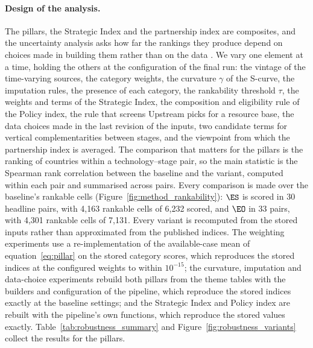 \paragraph{Design of the analysis.} The pillars, the Strategic Index and the partnership
index are composites, and the uncertainty analysis asks how far the rankings they produce
depend on choices made in building them rather than on the data
\citep{saisana2005uncertainty, oecd2008handbook, saltelli2008global}. We vary one element at a
time, holding the others at the configuration of the final run: the vintage of the time-varying
sources, the category weights, the curvature $\gamma$ of the S-curve, the imputation rules, the
presence of each category, the rankability threshold $\tau$, the weights and terms of the
Strategic Index, the composition and eligibility rule of the Policy index, the rule that
screens Upstream picks for a resource base, the data choices made in the last revision of the
inputs, two candidate terms for vertical complementarities between stages, and the viewpoint
from which the partnership index is averaged. The comparison that matters for the pillars is the
ranking of countries within a technology--stage pair, so the main statistic is the Spearman rank
correlation between the baseline and the variant, computed within each pair and summarised
across pairs. Every comparison is made over the baseline's rankable cells
(Figure~\ref{fig:method_rankability}): $\ES$ is scored in 30 headline pairs, with 4{,}163
rankable cells of 6{,}232 scored, and $\EO$ in 33 pairs, with 4{,}301 rankable cells of 7{,}131.
Every variant is recomputed from the stored inputs rather than approximated from the published
indices. The weighting experiments use a re-implementation of the available-case mean of
equation~\eqref{eq:pillar} on the stored category scores, which reproduces the stored indices
at the configured weights to within $10^{-15}$; the curvature, imputation and data-choice
experiments rebuild both pillars from the theme tables with the builders and configuration of
the pipeline, which reproduce the stored indices exactly at the baseline settings; and the
Strategic Index and Policy index are rebuilt with the pipeline's own functions, which reproduce
the stored values exactly. Table~\ref{tab:robustness_summary} and
Figure~\ref{fig:robustness_variants} collect the results for the pillars.



